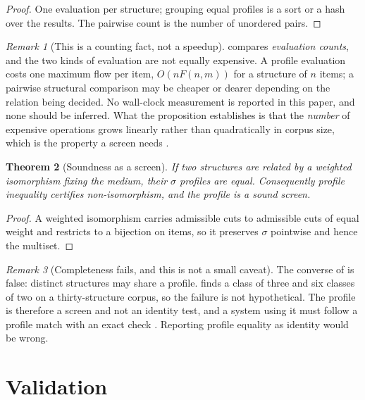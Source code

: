 \documentclass[11pt,twocolumn,a4paper]{article}
\theoremstyle{upthm}
\newtheorem{theorem}{Theorem}[section]
\theoremstyle{definition}
\theoremstyle{remark}
\newtheorem{remark}[theorem]{Remark}
\newcommand{\sep}{\sigma}
\begin{document}
\begin{proof}
One evaluation per structure; grouping equal profiles is a sort or a hash
over the results. The pairwise count is the number of unordered pairs.
\end{proof}

\begin{remark}[This is a counting fact, not a speedup]
\label{rem:not-speedup}
 compares \emph{evaluation counts}, and the two
kinds of evaluation are not equally expensive. A profile evaluation costs
one maximum flow per item, $O(nF(n,m))$ for a structure of $n$ items; a
pairwise structural comparison may be cheaper or dearer depending on the
relation being decided. No wall-clock measurement is reported in this
paper, and none should be inferred. What the proposition establishes is
that the \emph{number} of expensive operations grows linearly rather than
quadratically in corpus size, which is the property a screen needs
\citep{swamidass2007}.
\end{remark}

\begin{theorem}[Soundness as a screen]
\label{thm:screen}
If two structures are related by a weighted isomorphism fixing the
medium, their $\sep$ profiles are equal. Consequently profile inequality
certifies non-isomorphism, and the profile is a sound screen.
\end{theorem}

\begin{proof}
A weighted isomorphism carries admissible cuts to admissible cuts of
equal weight and restricts to a bijection on items, so it preserves
$\sep$ pointwise and hence the multiset.
\end{proof}

\begin{remark}[Completeness fails, and this is not a small caveat]
\label{rem:not-identity}
The converse of  is false: distinct structures may share
a profile.  finds a class of three and six classes
of two on a thirty-structure corpus, so the failure is not hypothetical.
The profile is therefore a screen and not an identity test, and a system
using it must follow a profile match with an exact check
\citep{barnard1993}. Reporting profile equality as identity would be
wrong.
\end{remark}

\section{Validation}
\label{sec:validation}
\end{document}
